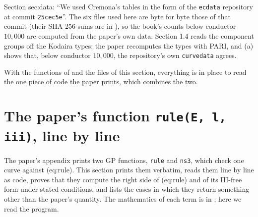 \begin{sloppypar}
\begin{paperlink}\label{pl:computation:ecdata}
Section sec:data: ``We used Cremona's tables \cite{Cremona97} in the form of the \texttt{ecdata} repository at commit \texttt{25cec5e}''. The six
files used here are byte for byte those of that commit (their SHA-256 sums are in ), so the book's counts
below conductor $10{,}000$ are computed from the paper's own data. Section 1.4 reads the component groups off the Kodaira types; the paper
recomputes the types with PARI, and (a) shows that, below conductor $10{,}000$, the repository's own
\texttt{curvedata} agrees.
\end{paperlink}

With the functions of  and the files of this section, everything is in place to read the one piece of code the
paper prints, which combines the two.
\section{The paper's function \texttt{rule(E, l, iii)}, line by line}\label{sec:computation:rule}

The paper's appendix prints two GP functions, \texttt{rule} and \texttt{ns3}, which check one curve against (eq:rule). This section prints them
verbatim, reads them line by line as code, proves that they compute the right side of (eq:rule) and of its III-free form under stated
conditions, and lists the cases in which they return something other than the paper's quantity. The mathematics of each term is in
; here we read the program.


\end{sloppypar}
